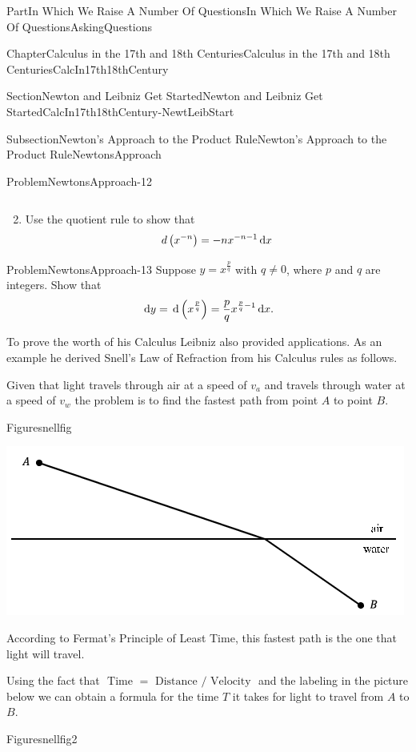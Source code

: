 \documentclass[oneside,10pt,]{book}
\numberwithin{equation}{part}
\newcommand{\dx}[1]{\,{\rm d}#1}
\begin{document}
\begin{partptx}{Part}{In Which We Raise A Number Of Questions}{}{In Which We Raise A Number Of Questions}{}{}{AskingQuestions}
\begin{chapterptx}{Chapter}{Calculus in the 17th and 18th Centuries}{}{Calculus in the 17th and 18th Centuries}{}{}{CalcIn17th18thCentury}
\begin{sectionptx}{Section}{Newton and Leibniz Get Started}{}{Newton and Leibniz Get Started}{}{}{CalcIn17th18thCentury-NewtLeibStart}
\begin{subsectionptx}{Subsection}{Newton's Approach to the Product Rule}{}{Newton's Approach to the Product Rule}{}{}{NewtonsApproach}
\begin{problem}{Problem}{}{NewtonsApproach-12}
\begin{enumerate}[font=\bfseries,label=(\alph*),ref=\alph*]
\begin{equation*}
\end{equation*}
%
\item{}Use the quotient rule to show that%
\begin{equation*}
d\left(x^{-n}\right)=-nx^{-n-1}\dx{x}
\end{equation*}
%
\end{enumerate}%
\end{problem}
\begin{problem}{Problem}{}{NewtonsApproach-13}%
 Suppose \(y=x^{\frac{p}{q}}\) with \(q\neq 0\), where \(p\) and \(q\) are integers. Show that%
\begin{equation*}
\dx{y}=\dx{
\left(x^{\frac{p}{q}}\right)}=\frac{p}{q}x^{\frac{p}{q}-1}\dx{
x}\text{.}
\end{equation*}
%
\end{problem}
To prove the worth of his Calculus Leibniz also provided applications.  As an example he derived Snell's Law of Refraction from his Calculus rules as follows.%
\par
Given that light travels through air at a speed of \(v_a\) and travels through water at a speed of \(v_w\) the problem is to find the fastest path from point \(A\) to point \(B\).%
\begin{figureptx}{Figure}{}{snellfig}{}%
\begin{image}{0.125}{0.75}{0.125}{}%
\includegraphics[width=\linewidth]{external/images/snellfig.png}
\end{image}%
\tcblower
\end{figureptx}%
According to Fermat's Principle of Least Time, this fastest path is the one that light will travel.%
\par
Using the fact that \(\text{ Time } =\text{ Distance }
/\text{ Velocity }\) and the labeling in the picture below we can obtain a formula for the time \(T\) it takes for light to travel from \(A\) to \(B\).%
\begin{figureptx}{Figure}{}{snellfig2}{}%

\end{figureptx}
\end{subsectionptx}
\end{sectionptx}
\end{chapterptx}
\end{partptx}
\end{document}
